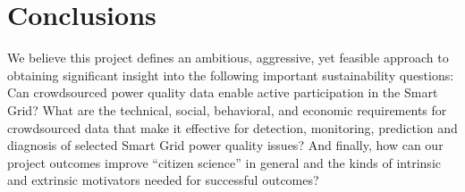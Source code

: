 \documentclass[11pt]{article}
\begin{document}

\section{Conclusions}
\label{sec:merit}




We believe this project defines an ambitious, aggressive, yet feasible approach to obtaining significant insight into the following important sustainability questions: Can crowdsourced power quality data enable active participation in the Smart Grid?  What are the technical, social, behavioral, and economic requirements for crowdsourced data that make it effective for detection, monitoring, prediction and diagnosis of selected Smart Grid power quality issues? And finally, how can our project outcomes improve ``citizen science'' in general and the kinds of intrinsic and extrinsic motivators needed for successful outcomes?
\end{document}
